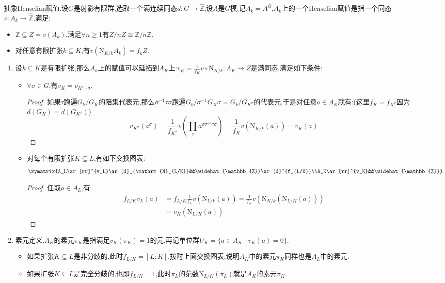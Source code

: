 抽象Henselian赋值.设$G$是射影有限群,选取一个满连续同态$d:G\to\widehat{\mathbb{Z}}$,设$A$是$G$模,记$A_k=A^{G}$,$A_k$上的一个Henselian赋值是指一个同态$v:A_k\to\widehat{\mathbb{Z}}$,满足:
\begin{itemize}
	\item $\mathbb{Z}\subseteq Z=v(A_k)$,满足$\forall n\ge1$有$Z/nZ\cong\mathbb{Z}/n\mathbb{Z}$.
	\item 对任意有限扩张$k\subseteq K$,有$v(\mathrm{N}_{K/k}A_k)=f_kZ$.
\end{itemize}
\begin{enumerate}
	\item 设$k\subseteq K$是有限扩张,那么$A_k$上的赋值可以延拓到$A_K$上:$v_K=\frac{1}{f_K}v\circ\mathrm{N}_{K/k}:A_K\to Z$是满同态,满足如下条件:
	\begin{itemize}
		\item $\forall\sigma\in G$,有$v_K=v_{K^{\sigma}\circ\sigma}$.
		\begin{proof}
			
			如果$\tau$跑遍$G_k/G_K$的陪集代表元,那么$\sigma^{-1}\tau\sigma$跑遍$G_k/\sigma^{-1}G_K\sigma=G_k/G_{K^{\sigma}}$的代表元,于是对任意$a\in A_K$就有:(这里$f_K=f_{K^{\sigma}}$因为$d(G_K)=d(G_{K^{\sigma}})$)
			$$v_{K^{\sigma}}(a^{\sigma})=\frac{1}{f_{K^{\sigma}}}v(\prod_{\tau}a^{\sigma\sigma^{-1}\tau\sigma})=\frac{1}{f_K}v(\mathrm{N}_{K/k}(a))=v_K(a)$$
		\end{proof}
	    \item 对每个有限扩张$K\subseteq L$,有如下交换图表:
	    $$\xymatrix{A_L\ar[rr]^{v_L}\ar[d]_{\mathrm{N}_{L/K}}&&\widehat{\mathbb{Z}}\ar[d]^{f_{L/K}}\\A_K\ar[rr]^{v_K}&&\widehat{\mathbb{Z}}}$$
	    \begin{proof}
	    	
	    	任取$a\in A_L$,有:
	    	\begin{align*}
	    	f_{L/K}v_L(a)&=f_{L/K}\frac{1}{f_L}v(\mathrm{N}_{L/k}(a))=\frac{1}{f_K}v(\mathrm{N}_{K/k}(\mathrm{N}_{L/K}(a)))\\&=v_K(\mathrm{N}_{L/K}(a))
	    	\end{align*}
	    \end{proof}
	\end{itemize}
    \item 素元定义.$A_K$的素元$\pi_K$是指满足$v_K(\pi_K)=1$的元.再记单位群$U_K=\{a\in A_K\mid v_K(a)=0\}$.
    \begin{itemize}
    	\item 如果扩张$K\subseteq L$是非分歧的,此时$f_{L/K}=[L:K]$,按时上面交换图表,说明$A_K$中的素元$\pi_K$同样也是$A_L$中的素元.
    	\item 如果扩张$K\subseteq L$是完全分歧的,也即$f_{L/K}=1$,此时$\pi_L$的范数$\mathrm{N}_{L/K}(\pi_L)$就是$A_K$的素元$\pi_K$.
    \end{itemize}
\end{enumerate}

